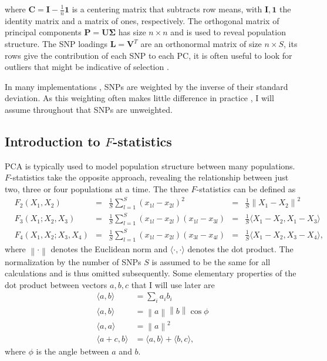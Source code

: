 \documentclass[12pt,fullpage, a4paper]{article}
\newcommand{\norm}[1]{\left\lVert#1\right\rVert}
\newcommand{\normsq}[1]{\left\lVert#1\right\rVert^2}
\newcommand{\MC}{\mathbf{C}} %
\newcommand{\MP}{\mathbf{P}} %
\newcommand{\ML}{\mathbf{L}} %
\newcommand{\MSINGULAR}{\mathbf{\Sigma}} %
\begin{document}
	where $\MC = \mathbf{I} -\frac{1}{n}\mathbf{1}$ is a centering matrix that subtracts row means, with $\mathbf{I}, \mathbf{1}$  the identity matrix and a matrix of ones, respectively. The orthogonal matrix of principal components $\MP=\mathbf{U}\MSINGULAR$ has size $n \times n$ and is used to reveal population structure. The SNP loadings $\ML=\mathbf{V}^T$ are an orthonormal matrix of size $n \times S$, its rows give the contribution of each SNP to each PC, it is often useful to look for outliers that might be indicative of selection \citep[e.g][]{francois2010}.
	
	In many  implementations \citep[e.g.][]{patterson2006}, SNPs are weighted by
    the inverse of their standard deviation. As this weighting often makes little
    difference in practice \citep{mcvean2009}, I will assume throughout that SNPs
    are unweighted.

\subsection{Introduction to $F$-statistics}
PCA is typically used to model population structure between many populations. $F$-statistics take the opposite approach, revealing the relationship between just two,  three or four populations at a time. The three $F$-statistics can be defined as 
\begin{subequations}
	\begin{align}
	&F_2(X_1, X_2) &=& \frac{1}{S}\sum_{l=1}^S(x_{1l} - x_{2l})^2 &=& \frac{1}{S}\normsq{X_1-  X_2}\\
	&F_3(X_1; X_2, X_3) &=& \frac{1}{S}\sum_{l=1}^S(x_{1l} - x_{2l})(x_{1l} - x_{3l}) &=& \frac{1}{S}\langle X_1 - X_2, X_1 - X_3 \rangle\\	
	&F_4(X_1, X_2; X_3, X_4) &=& \frac{1}{S}\sum_{l=1}^S(x_{1l} - x_{2l})(x_{3l} - x_{4l}) &=& \frac{1}{S}\langle X_1 - X_2, X_3 - X_4 \rangle	\text{,}
	\end{align}
\end{subequations}
where $\norm{\cdot}$ denotes the Euclidean norm and $\langle \cdot, \cdot \rangle$ denotes the dot product. The normalization by the number of SNPs $S$ is assumed to be the same for all calculations and is thus omitted subsequently. Some elementary properties of the dot product between vectors $a, b, c$ that I will use later are
\begin{subequations}
\begin{align}
\langle a, b \rangle &= \sum_i a_ib_i\\
\langle a, b \rangle &= \norm{a}\norm{b}\cos{\phi}\\
\langle a, a \rangle &= \normsq{a}\\
\langle a + c, b \rangle &= \langle a, b \rangle + \langle b, c \rangle,
\end{align}
\end{subequations}
where $\phi$ is the angle between $a$ and $b$. 
\end{document}

